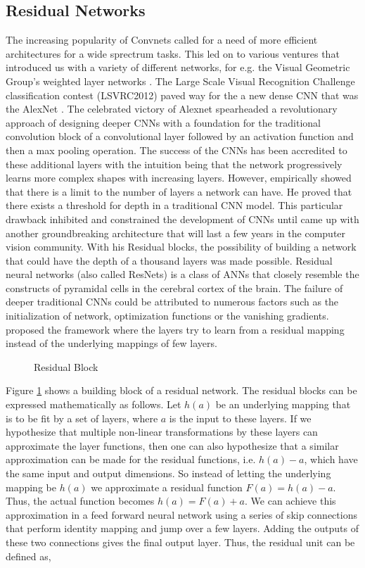 \documentclass[fleqn,usenatbib]{mnras}
\begin{document}
\subsection{Residual Networks}
\hspace*{0.25 in}The increasing popularity of Convnets called for a need of more efficient architectures for a wide sprectrum tasks. This led on to various ventures that introduced us with a variety of different networks, for e.g. the Visual Geometric Group's weighted layer networks \citep{simonyan}. The Large Scale Visual Recognition Challenge classification contest (LSVRC2012) paved way for the a new dense CNN that was the AlexNet \citep{alex}. The celebrated victory of Alexnet spearheaded a revolutionary approach of designing deeper CNNs with a foundation for the traditional convolution block of a convolutional layer followed by an activation function and then a max pooling operation. The success of the CNNs has been accredited to these additional layers with the intuition being that the network progressively learns more complex shapes with increasing layers. However, \citet{he2016} empirically showed that there is a limit to the number of layers a network can have. He proved that there exists a threshold for depth in a traditional CNN model. This particular drawback inhibited and constrained the development of CNNs until \citet{he2016} came up with another groundbreaking architecture that will last a few years in the computer vision community. With his Residual blocks, the possibility of building a network that could have the depth of a thousand layers was made possible. Residual neural networks (also called ResNets) is a class of ANNs that closely resemble the constructs of pyramidal cells in the cerebral cortex of the brain. The failure of deeper traditional CNNs could be attributed to numerous factors such as the initialization of network, optimization functions or the vanishing gradients. \citet{he2016} proposed the framework where the layers try to learn from a residual mapping instead of the underlying mappings of few layers. \\
\begin{figure}
    \centering
    
    \caption{Residual Block}
    \label{fig: residual block}
\end{figure}
\hspace*{0.25 in}Figure \ref{fig: residual block} shows a building block of a residual network. The residual blocks can be expressed mathematically as follows. Let $h(a)$ be an underlying mapping that is to be fit by a set of layers, where $a$ is the input to these layers. If we hypothesize that multiple non-linear transformations by these layers can approximate the layer functions, then one can also hypothesize that a similar approximation can be made for the residual functions, i.e. $h(a) - a$, which have the same input and output dimensions. So instead of letting the underlying mapping be $h(a)$ we approximate a residual function $F(a) = h(a) - a$. Thus, the actual function becomes $h(a) = F(a) + a$. We can achieve this approximation in a feed forward neural network using a series of skip connections that perform identity mapping and jump over a few layers. Adding the outputs of these two connections gives the final output layer. Thus, the residual unit can be defined as,
\end{document}
